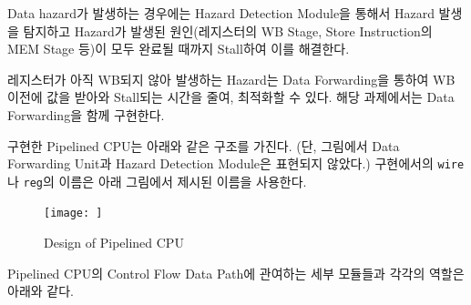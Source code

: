 \documentclass[openright, a4paper]{article}
\newcommand{\code}[1]{\texttt{#1}}
\begin{document}
\hfill

Data hazard가 발생하는 경우에는 Hazard Detection Module을 통해서 Hazard 발생을 탐지하고 Hazard가 발생된 원인(레지스터의 WB Stage, Store Instruction의 MEM Stage 등)이 모두 완료될 때까지 Stall하여 이를 해결한다.

\hfill

레지스터가 아직 WB되지 않아 발생하는 Hazard는 Data Forwarding을 통하여 WB 이전에 값을 받아와 Stall되는 시간을 줄여, 최적화할 수 있다. 해당 과제에서는 Data Forwarding을 함께 구현한다.

\hfill

구현한 Pipelined CPU는 아래와 같은 구조를 가진다. (단, 그림에서 Data Forwarding Unit과 Hazard Detection Module은 표현되지 않았다.) 구현에서의 \code{wire}나 \code{reg}의 이름은 아래 그림에서 제시된 이름을 사용한다.

\hfill

{
    \begin{figure}[!h]
        \centering
        \texttt{[image: ]}
        \caption{Design of Pipelined CPU}
    \end{figure}
}

\hfill

Pipelined CPU의 Control Flow Data Path에 관여하는 세부 모듈들과 각각의 역할은 아래와 같다.

\hfill
\end{document}

